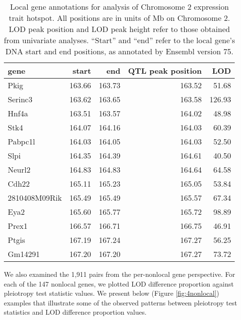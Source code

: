 \documentclass{book}
\begin{document}
\begin{table}[ht]
\centering
\begin{tabular}{lrrrr}
  \hline
gene & start & end & QTL peak position & LOD\\
  \hline
Pkig & 163.66 & 163.73 & 163.52 & 51.68 \\
  Serinc3 & 163.62 & 163.65 & 163.58 & 126.93 \\
  Hnf4a & 163.51 & 163.57 & 164.02 & 48.98 \\
  Stk4 & 164.07 & 164.16 & 164.03 & 60.39 \\
  Pabpc1l & 164.03 & 164.05 & 164.03 & 52.50 \\
  Slpi & 164.35 & 164.39 & 164.61 & 40.50 \\
  Neurl2 & 164.83 & 164.83 & 164.64 & 64.58 \\
  Cdh22 & 165.11 & 165.23 & 165.05 & 53.84 \\
  2810408M09Rik & 165.49 & 165.49 & 165.57 & 67.34 \\
  Eya2 & 165.60 & 165.77 & 165.72 & 98.89 \\
  Prex1 & 166.57 & 166.71 & 166.75 & 46.91 \\
  Ptgis & 167.19 & 167.24 & 167.27 & 56.25 \\
  Gm14291 & 167.20 & 167.20 & 167.27 & 73.72 \\
   \hline
\end{tabular}
\caption{Local gene annotations for analysis of Chromosome 2 expression trait hotspot. All positions are in units of Mb on Chromosome 2. LOD peak position and LOD peak height refer to those obtained from univariate analyses. ``Start'' and ``end'' refer to the local gene's DNA start and end positions, as annotated by Ensembl version 75.}
\label{tab:annot}
\end{table}


We also examined the 1,911 pairs from the per-nonlocal gene perspective. For each of the 147 nonlocal genes, we plotted LOD difference proportion against pleiotropy test statistic values. We present below (Figure \ref{fig:4nonlocal}) examples that illustrate some of the observed patterns between pleiotropy test statistics and LOD difference proportion values.
\end{document}
